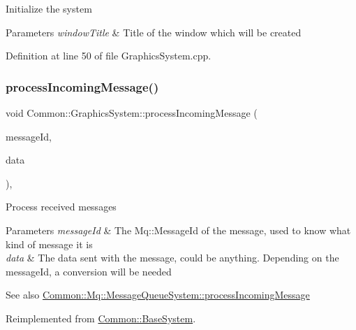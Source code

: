 Initialize the system 
\begin{DoxyParams}{Parameters}
{\em window\+Title} & Title of the window which will be created \\
\hline
\end{DoxyParams}


Definition at line 50 of file Graphics\+System.\+cpp.

\mbox{\label{class_common_1_1_graphics_system_a8d286a151ed9a65f0eebe1ac119e2d59}} 
\subsubsection{\texorpdfstring{process\+Incoming\+Message()}{processIncomingMessage()}}
{\footnotesize\ttfamily void Common\+::\+Graphics\+System\+::process\+Incoming\+Message (\begin{DoxyParamCaption}\item[{\hyperlink{group___common_gaa8c87d2b450282716c906da283e149e6}{Mq\+::\+Message\+Id}}]{message\+Id,  }\item[{const void $\ast$}]{data }\end{DoxyParamCaption})\hspace{0.3cm}{\ttfamily [protected]}, {\ttfamily [virtual]}}

Process received messages 
\begin{DoxyParams}{Parameters}
{\em message\+Id} & The Mq\+::\+Message\+Id of the message, used to know what kind of message it is \\
\hline
{\em data} & The data sent with the message, could be anything. Depending on the message\+Id, a conversion will be needed \\
\hline
\end{DoxyParams}
\begin{DoxySeeAlso}{See also}
\hyperlink{class_common_1_1_mq_1_1_message_queue_system_ad6eb849b72f03e3e4f09c6457c8ecda6}{Common\+::\+Mq\+::\+Message\+Queue\+System\+::process\+Incoming\+Message} 
\end{DoxySeeAlso}


Reimplemented from \hyperlink{class_common_1_1_base_system_a6820dfed1ee63f376e5773b361e3d2a8}{Common\+::\+Base\+System}.



